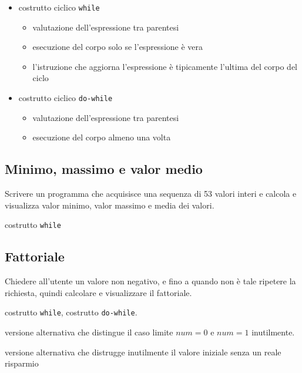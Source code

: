 \begin{itemize}
\item costrutto ciclico \texttt{while}
    \begin{itemize}
    \item valutazione dell'espressione tra parentesi
    \item esecuzione del corpo solo se l'espressione \`e vera
    \item l'istruzione che aggiorna l'espressione  \`e tipicamente l'ultima del corpo del ciclo
    \end{itemize}
\item costrutto ciclico \texttt{do-while}
    \begin{itemize}
    \item valutazione dell'espressione tra parentesi
    \item esecuzione del corpo almeno una volta 
    \end{itemize}
\end{itemize}

\mysep{}

\subsection{Minimo, massimo e valor medio}
Scrivere un programma che acquisisce una sequenza di 53 valori interi e calcola e visualizza valor minimo, valor massimo e media dei valori. 

\begin{tags}
costrutto \texttt{while}
\end{tags}



\subsection{Fattoriale}
Chiedere all'utente un valore non negativo, e fino a quando non \`e tale ripetere la richiesta, quindi calcolare e visualizzare il fattoriale.

\begin{tags}
costrutto \texttt{while}, costrutto \texttt{do-while}.
\end{tags}



versione alternativa che distingue il caso limite $num=0$ e $num=1$ inutilmente.



versione alternativa che distrugge inutilmente il valore iniziale senza un reale risparmio



